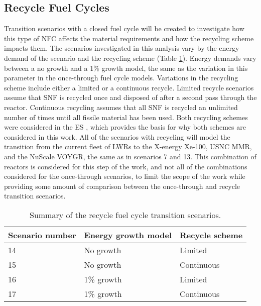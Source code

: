 \subsection{Recycle Fuel Cycles}
Transition scenarios with a closed fuel cycle will be created
to investigate how this type of \gls{NFC} affects the material requirements 
and how the recycling scheme impacts them. 
The scenarios investigated in this analysis vary by the 
energy demand of the scenario and the recycling scheme (Table 
\ref{tab:scenarios_recycle}). Energy demands vary 
between a no growth and a 1\% growth model, the same as the variation in this 
parameter in the once-through fuel cycle models. Variations in the recycling 
scheme include either a limited or a continuous recycle. Limited recycle 
scenarios assume that \gls{SNF} is recycled once and disposed of after a 
second pass through the reactor. Continuous recycling assumes that all 
\gls{SNF} is recycled an unlimited number of times until all fissile 
material has been used. Both recycling schemes were considered in the 
\acrfull{ES} \cite{wigeland_nuclear_2014}, which provides the basis for why 
both schemes are considered in this work.  
All of the scenarios with recycling will model the transition from the 
current fleet of \glspl{LWR} to the X-energy Xe-100, \gls{USNC} \gls{MMR}, 
and the NuScale VOYGR, the same as in scenarios 7 and 13. This combination 
of reactors is considered for this step of the work, and not all of the 
combinations considered for the once-through scenarios, to limit the scope 
of the work while providing some amount of comparison between the 
once-through and recycle transition scenarios. 

\begin{table}[ht]
    \centering
    \caption{Summary of the recycle fuel cycle transition scenarios.}
    \label{tab:scenarios_recycle}
    \begin{tabular}{l l l}
            \hline
            Scenario number & Energy growth model & Recycle scheme\\\hline
            14 & No growth & Limited \\
            15 & No growth & Continuous \\
            16 & 1\% growth & Limited \\
            17 & 1\% growth & Continuous \\
            \hline
    \end{tabular}
\end{table}

